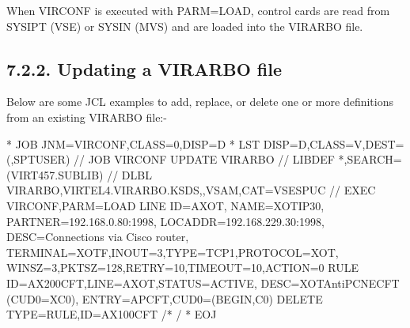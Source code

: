 \documentclass[letterpaper,10pt,english]{sphinxmanual}
\begin{document}

When VIRCONF is executed with PARM=LOAD, control cards are read from SYSIPT (VSE) or SYSIN (MVS) and are loaded into the VIRARBO file.


\subsection{7.2.2. Updating a VIRARBO file}
\label{\detokenize{Installation_Guide:updating-a-virarbo-file}}
Below are some JCL examples to add, replace, or delete one or more definitions from an existing VIRARBO file:-

\begin{sphinxVerbatim}[commandchars=\\\{\}]
* \PYGZdl{}\PYGZdl{} JOB JNM=VIRCONF,CLASS=0,DISP=D
* \PYGZdl{}\PYGZdl{} LST DISP=D,CLASS=V,DEST=(,SPTUSER)
// JOB VIRCONF UPDATE VIRARBO
// LIBDEF *,SEARCH=(VIRT457.SUBLIB)
// DLBL VIRARBO,\PYGZsq{}VIRTEL4.VIRARBO.KSDS\PYGZsq{},,VSAM,CAT=VSESPUC
// EXEC VIRCONF,PARM=\PYGZsq{}LOAD\PYGZsq{}
        LINE  ID=A\PYGZhy{}XOT,
              NAME=XOT\PYGZhy{}IP30,
              PARTNER=192.168.0.80:1998,
              LOCADDR=192.168.229.30:1998,
              DESC=\PYGZsq{}Connections via Cisco router\PYGZsq{},
              TERMINAL=XOTF,INOUT=3,TYPE=TCP1,PROTOCOL=XOT,
              WINSZ=3,PKTSZ=128,RETRY=10,TIMEOUT=10,ACTION=0
        RULE ID=AX200CFT,LINE=A\PYGZhy{}XOT,STATUS=ACTIVE,
              DESC=\PYGZdq{}XOT\PYGZhy{}\PYGZgt{}AntiPCNE\PYGZhy{}\PYGZgt{}CFT (CUD0=X\PYGZsq{}C0\PYGZsq{})\PYGZdq{},
              ENTRY=APCFT,CUD0=(BEGIN,C0)
        DELETE TYPE=RULE,ID=AX100CFT
/*
/\PYGZam{}
* \PYGZdl{}\PYGZdl{} EOJ
\end{sphinxVerbatim}

\end{document}
